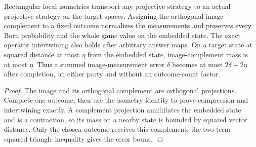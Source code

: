 \begin{lemma}
\label{lem:intro-isometric-strategy}
\leanok
Rectangular local isometries transport any projective strategy to an actual
projective strategy on the target spaces. Assigning the orthogonal image
complement to a fixed outcome normalizes the measurements and preserves
every Born probability and the whole game value on the embedded state.
The exact operator intertwining also holds after arbitrary answer maps.
On a target state at squared distance at most $\eta$ from the embedded state,
image-complement mass is at most $\eta$. Thus a summed image-measurement
error $\delta$ becomes at most $2\delta+2\eta$ after completion, on either
party and without an outcome-count factor.
\end{lemma}
\begin{proof}
\leanok
The image and its orthogonal complement are orthogonal projections.
Complete one outcome, then use the isometry identity to prove compression
and intertwining exactly. A complement projection annihilates the embedded
state and is a contraction, so its mass on a nearby state is bounded by
squared vector distance. Only the chosen outcome receives this complement;
the two-term squared triangle inequality gives the error bound.
\end{proof}

